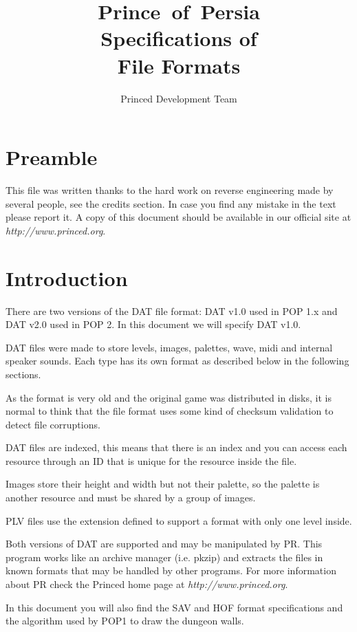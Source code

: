 \documentclass{article}
\author{Princed Development Team}
\title{Prince~of~Persia\\ Specifications of\\ File Formats}
\begin{document}
\maketitle
\tableofcontents
\newpage

\section{Preamble}

 This file was written thanks to the hard work on reverse engineering made
 by several people, see the credits section. In case you find any mistake
 in the text please report it. A copy of this document should be available
 in our official site at {\it http://www.princed.org}.


\section{Introduction}

 There are two versions of the  DAT file format: DAT v1.0 used in POP 1.x
 and DAT v2.0 used in POP 2. In this document we will specify DAT v1.0.

 DAT files were made to store levels, images, palettes, wave, midi and
 internal speaker sounds. Each type has its own format as described below
 in the following sections.

 As the format is very old and the original game was distributed in disks,
 it is normal to think that the file format uses some kind of checksum
 validation to detect file corruptions.

 DAT files are indexed, this means that there is an index and you can
 access each resource through an ID that is unique for the resource inside
 the file.

 Images store their height and width but not their palette, so the palette
 is another resource and must be shared by a group of images.

 PLV files use the extension defined to support a format with only one
 level inside.

 Both versions of DAT are supported and may be manipulated by  PR. This
 program works like an archive manager (i.e. pkzip) and extracts the files
 in known formats that may be handled by other programs. For more
 information about PR check the Princed home page at
 {\it http://www.princed.org}.

 In this document you will also find the  SAV and  HOF format specifications
 and the algorithm used by POP1 to draw the  dungeon walls.
\end{document}

